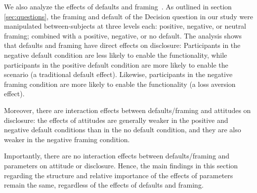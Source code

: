 We also analyze the effects of defaults and framing~\cite{bahirat2018exploring}. As outlined in section \ref{sec:questions}, the framing and default of the Decision question in our study were manipulated between-subjects at three levels each: positive, negative, or neutral framing; combined with a positive, negative, or no default. The analysis shows that defaults and framing have direct effects on disclosure: Participants in the negative default condition are less likely to enable the functionality, while participants in the positive default condition are more likely to enable the scenario (a traditional default effect). Likewise, participants in the negative framing condition are more likely to enable the functionality (a loss aversion effect).

Moreover, there are interaction effects between defaults/framing and attitudes on disclosure: the effects of attitudes are generally weaker in the positive and negative default conditions than in the no default condition, and they are also weaker in the negative framing condition.

Importantly, there are no interaction effects between defaults/framing and parameters on attitude or disclosure. Hence, the main findings in this section regarding the structure and relative importance of the effects of parameters remain the same, regardless of the effects of defaults and framing.

